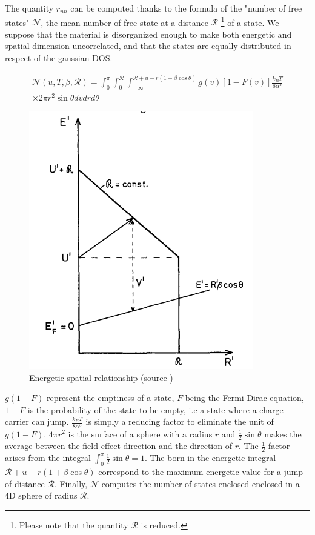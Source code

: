 The quantity $r_{nn}$ can be computed thanks to the formula of the "number of free states" $\mathscr{N}$, the mean number of free state at a distance $\mathscr{R}$ \footnote{Please note that the quantity $\mathscr{R}$ is reduced.} of a state. We suppose that the material is disorganized enough to make both energetic and spatial dimension uncorrelated, and that the states are equally distributed in respect of the gaussian DOS.

\begin{equation}
    \begin{aligned}
    \mathcal{N}\left(u, T, \beta, \mathscr{R}\right)=\int_{0}^{\pi} \int_{0}^{\mathscr{R}} \int_{-\infty}^{\mathscr{R}+u-r(1+\beta \cos \theta)} g\left(v\right)\left[1-F\left(v\right)\right] \frac{k_B T}{8 \alpha^{3}} \\
    \times 2 \pi r^2 \sin \theta d v d r d \theta
    \end{aligned}
    \label{eq:3_3}
\end{equation}

\begin{figure}[!h]
    \centering
    \includegraphics[width=.4\paperwidth]{figures/3_elec/R_max.png}
    \caption{Energetic-spatial relationship \label{fig:R_max} (source \cite{hopping_theory_1})}
\end{figure}

$g(1 - F)$ represent the emptiness of a state, $F$ being the Fermi-Dirac equation, $1 - F$ is the probability of the state to be empty, i.e a state where a charge carrier can jump. $\frac{k_B T}{8 \alpha^{3}}$ is simply a reducing factor to eliminate the unit of $g(1-F)$. $4\pi r^2$ is the surface of a sphere with a radius $r$ and $\frac{1}{2}\sin \theta$ makes the average between the field effect direction and the direction of $r$. The $\frac{1}{2}$ factor arises from the integral $\int_0^\pi \frac{1}{2}\sin \theta = 1$. The born in the energetic integral $\mathscr{R}+u-r(1+\beta \cos \theta)$ correspond to the maximum energetic value for a jump of distance $\mathscr{R}$. Finally, $\mathcal{N}$ computes the number of states enclosed enclosed in a 4D sphere of radius $\mathscr{R}$.

